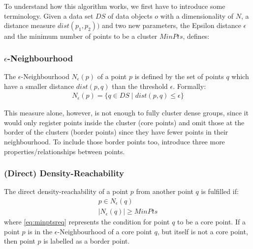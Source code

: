 To understand how this algorithm works, we first have to introduce some terminology.
Given a data set $DS$ of data objects $o$ with a dimensionality of $N$, a distance measure $dist(p_1,p_2))$ and two new parameters, the Epsilon distance $\epsilon$ and the minimum number of points to be a cluster $MinPts$, \citeauthor{DBSCANEKSX96} defines:

\subsubsection*{$\epsilon$-Neighbourhood}
The $\epsilon$-Neighbourhood $N_{\epsilon}(p)$ of a point $p$ is defined by the set of points $q$ which have a smaller distance $dist(p,q)$ than the threshold $\epsilon$. Formally: 
\begin{align}
    N_{\epsilon}(p)=\{q \in DS \mid dist(p,q) \leq \epsilon\}
\end{align}

This measure alone, however, is not enough to fully cluster dense groups, since it would only register points inside the cluster (core points) and omit those at the border of the clusters (border points) since they have fewer points in their neighbourhood. To include those border points too, \citeauthor{DBSCANEKSX96} introduce three more properties/relationships between points.

\subsubsection*{(Direct) Density-Reachability}
The direct density-reachability of a point $p$ from another point $q$ is fulfilled if:
\begin{align}
    p \in N_{\epsilon}(q)\label{eq:pinN}\\
    |N_{\epsilon}(q)|\geq MinPts\label{eq:minptsreq}
\end{align}
where \autoref{eq:minptsreq} represents the condition for point \(q\) to be a core point. If a point \(p\) is in the $\epsilon$-Neighbourhood of a core point $q$, but itself is not a core point, then point $p$ is labelled as a border point. 

